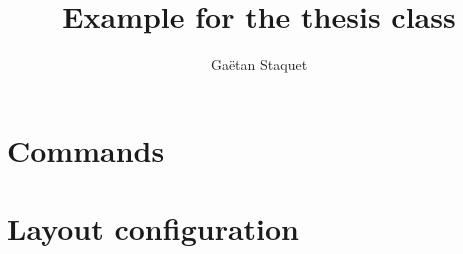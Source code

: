 \documentclass{thesis}
\title{Example for the thesis class}
\author{Gaëtan Staquet}
\begin{document}
  \maketitle

  \chapter{Commands}

  \chapter{Layout configuration}
\end{document}

